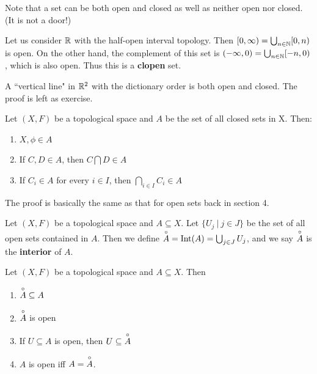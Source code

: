 Note that a set can be both open and closed as well as neither open nor closed. (It is not a door!) 
\begin{example}
	Let us consider $\mathbb R$ with the half-open interval topology. Then $[ 0,\infty) =\bigcup _{n \in \mathbb N} [0,n)$ is open. On the other hand, the complement of this set is $(-\infty,0) =\bigcup_{n \in\mathbb N } [-n,0)$, which is also open. Thus this is a \textbf{clopen} set. 
\end{example}
\begin{example}
	A ``vertical line" in $\mathbb R^{2}$ with the dictionary order is both open and closed. The proof is left as exercise. 
\end{example}
\begin{lemma}
	Let $(X,F)$ be a topological space and $A$ be the set of all closed sets in X. Then: 
	\begin{enumerate}
		\item $X,\phi \in A$ 
		\item If $C,D \in A$, then $C \bigcap D \in A$ 
		\item If $C_i \in A$ for every $i \in I$, then $\bigcap_{i\in I}C_i \in A$ 
	\end{enumerate}
\end{lemma}
The proof is basically the same as that for open sets back in section 4. 
\begin{definition}
	Let $(X,F)$ be a topological space and $A \subseteq X$. Let $\{ U_j\ |\ j \in J \}$ be the set of all open sets contained in $A$. Then we define $\overset{\circ}{A} = \mathrm{Int}(A) = \bigcup_{j \in J} U_j$, and we say $\overset{\circ}{A}$ is the \textbf{interior} of $A$. 
\end{definition}
\begin{smallfact}
	Let $(X,F)$ be a topological space and $A \subseteq X$. Then 
	\begin{enumerate}
		\item $\overset{\circ}{A} \subseteq A$ 
		\item $\overset{\circ}{A}$ is open 
		\item If $U\subseteq A$ is open, then $U\subseteq \overset{\circ}{A}$ 
		\item $A$ is open iff $A = \overset{\circ}{A}$. 
	\end{enumerate}
\end{smallfact}
